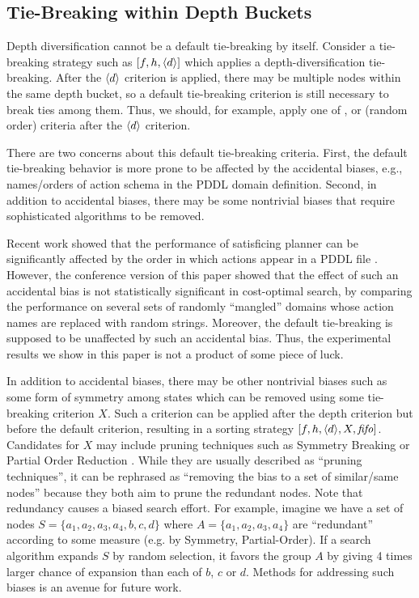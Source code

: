 \subsection{Tie-Breaking within Depth Buckets}

Depth diversification cannot be a default tie-breaking by itself.
Consider a tie-breaking strategy such as $[f,h,{\left<d\right>}]$ which applies a depth-diversification tie-breaking.
After the ${\left<d\right>}$ criterion is applied, 
there may be multiple nodes within the same depth bucket, so a
default tie-breaking criterion is still necessary to break ties among them.
Thus, we should, for example, apply one of \lifo, \fifo or \ro (random order) criteria
after the ${\left<d\right>}$ criterion.

There are two concerns about this default tie-breaking criteria.
First, the default tie-breaking behavior is more prone to be
affected by the accidental biases, e.g., names/orders of action schema in the PDDL domain definition.
Second, in addition to accidental biases, there may be some nontrivial biases that require 
sophisticated algorithms to be removed.

Recent work  showed that the performance of satisficing
planner can be significantly affected by the order in which actions appear in a PDDL file \cite{vallati2015effective}.
However, the conference version of this paper \cite{Asai2016} showed that
the effect of such an accidental bias is not statistically significant in cost-optimal search,
by comparing the performance on
several sets of randomly ``mangled'' domains whose action names are replaced with random strings.
Moreover, the \ro default tie-breaking is supposed to be unaffected by such an accidental bias.
Thus, the experimental results we show in this paper is not a product of some piece of luck.

In addition to accidental biases, there may be other nontrivial biases such as some form of symmetry among states which can be removed using some tie-breaking criterion $X$.
Such a criterion can be applied after the depth criterion but before the default criterion,
resulting in a sorting strategy $[f,h,{\left<d\right>},X,{\text{\textit{fifo}}}]$. 
Candidates for $X$ may
include pruning techniques such as Symmetry Breaking \cite{Fox1998,pochter2011exploiting,domshlak2013symmetry} or
Partial Order Reduction \cite{hall2013faster,wehrle2013relative}.
While they are usually described as ``pruning techniques'',
it can be rephrased as ``removing the bias to a set of similar/same nodes'' because
they both aim to prune the redundant nodes.
Note that redundancy causes a biased search effort. For example, imagine we have a
set of nodes $S=\{a_1, a_2, a_3, a_4, b, c, d\}$ where
$A=\{a_1, a_2, a_3, a_4\}$ are ``redundant'' according to some measure (e.g. by Symmetry,
Partial-Order). 
If a search algorithm expands $S$ by random selection, it favors the
group $A$ by giving 4 times larger chance of expansion than each of $b$,
$c$ or $d$.
Methods for addressing such biases is an avenue for future work.



